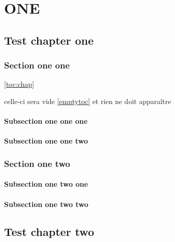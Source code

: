 \documentclass{book}
\begin{document}
\tableofcontents

\part{ONE}

\renewcommand\contentsname{Local contents}

\localtableofcontents


\chapter{Test chapter one}

\localtableofcontents\label{toc:chap}

\section{Section one one}
\localtableofcontents*\ref{toc:chap}

celle-ci sera vide
\localtableofcontents\ref{emptytoc}%
et rien ne doit apparaître

\subsection{Subsection one one one}
\subsection{Subsection one  one two}
\section{Section one two}
\subsection{Subsection one two one}
\subsection{Subsection one  two two}

\chapter{Test chapter two}
\end{document}
